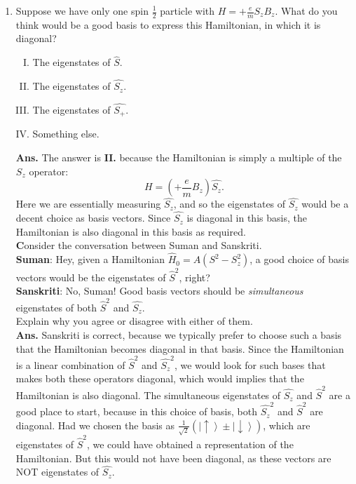 \documentclass[12pt]{article}
\begin{document}
\begin{enumerate}[1.]
\item Suppose we have only one spin $\frac{1}{2}$ particle with $H=+\frac{e}{m} S_z B_z$. What do you think would be a good basis to express this Hamiltonian, in which it is diagonal?
       \begin{enumerate}[I.]
              \item The eigenstates of $\hat{S}$.
              \item The eigenstates of $\hat{S_z}$.
              \item The eigenstates of $\hat{S_+}$.
              \item Something else. \newline
       \end{enumerate}
\textbf{Ans.} The answer is \textbf{II.} because the Hamiltonian is simply a multiple of the $S_z$ operator: $$H=\left(+\frac{e}{m} B_z\right) \hat{S_z}.$$ Here we are essentially measuring $\hat{S_z}$, and so the eigenstates of $\hat{S_z}$ would be a decent choice as basis vectors. Since $\hat{S_z}$ is diagonal in this basis, the Hamiltonian is also diagonal in this basis as required. \\
\newpage
\textbf{C}onsider the conversation between Suman and Sanskriti. \\
\textbf{Suman}: Hey, given a Hamiltonian $\hat{H}_0=A(S^2-S_z^2)$, a good choice of basis vectors would be the eigenstates of $\hat{S}^2$, right? \\
\textbf{Sanskriti}: No, Suman! Good basis vectors should be \emph{simultaneous} eigenstates of both $\hat{S}^2$ and $\hat{S_z}$. \\
Explain why you agree or disagree with either of them. \\
\newline
\textbf{Ans.} Sanskriti is correct, because we typically prefer to choose such a basis that the Hamiltonian becomes diagonal in that basis. Since the Hamiltonian is a linear combination of $\hat{S}^2$ and $\hat{S_z}^2$, we would look for such bases that makes both these operators diagonal, which would implies that the Hamiltonian is also diagonal. The simultaneous eigenstates of $\hat{S_z}$ and $\hat{S}^2$ are a good place to start, because in this choice of basis, both $\hat{S_z}^2$ and $\hat{S}^2$ are diagonal. Had we chosen the basis as $\frac{1}{\sqrt{2}}\left(\left|\uparrow \right \rangle \pm \left | \downarrow \right \rangle \right)$, which are eigenstates of $\hat{S}^2$, we could have obtained a representation of the Hamiltonian. But this would not have been diagonal, as these vectors are NOT eigenstates of $\hat{S_z}$. \\

\end{enumerate}
\end{document}
